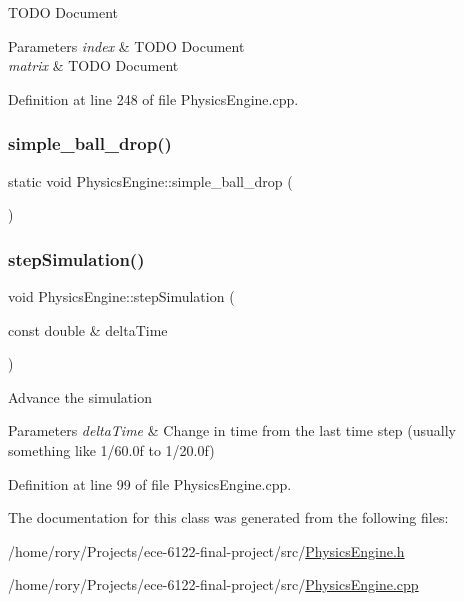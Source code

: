 T\+O\+DO Document 
\begin{DoxyParams}{Parameters}
{\em index} & T\+O\+DO Document \\
\hline
{\em matrix} & T\+O\+DO Document \\
\hline
\end{DoxyParams}


Definition at line 248 of file Physics\+Engine.\+cpp.

\mbox{\label{class_physics_engine_a78f7f38916d7781c79b7818658c4619a}} 
\subsubsection{\texorpdfstring{simple\+\_\+ball\+\_\+drop()}{simple\_ball\_drop()}}
{\footnotesize\ttfamily static void Physics\+Engine\+::simple\+\_\+ball\+\_\+drop (\begin{DoxyParamCaption}{ }\end{DoxyParamCaption})\hspace{0.3cm}{\ttfamily [static]}}

\mbox{\label{class_physics_engine_ac9895c911f76466da7a7980d72cf9b08}} 
\subsubsection{\texorpdfstring{step\+Simulation()}{stepSimulation()}}
{\footnotesize\ttfamily void Physics\+Engine\+::step\+Simulation (\begin{DoxyParamCaption}\item[{const double \&}]{delta\+Time }\end{DoxyParamCaption})}

Advance the simulation 
\begin{DoxyParams}{Parameters}
{\em delta\+Time} & Change in time from the last time step (usually something like 1/60.\+0f to 1/20.\+0f) \\
\hline
\end{DoxyParams}


Definition at line 99 of file Physics\+Engine.\+cpp.



The documentation for this class was generated from the following files\+:\begin{DoxyCompactItemize}
\item 
/home/rory/\+Projects/ece-\/6122-\/final-\/project/src/\hyperlink{_physics_engine_8h}{Physics\+Engine.\+h}\item 
/home/rory/\+Projects/ece-\/6122-\/final-\/project/src/\hyperlink{_physics_engine_8cpp}{Physics\+Engine.\+cpp}\end{DoxyCompactItemize}
